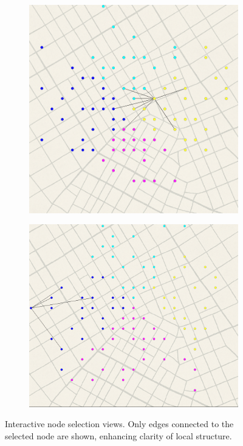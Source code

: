 \documentclass[12pt]{article}
\begin{document}
\begin{figure}[H]
    \centering
    \begin{subfigure}[b]{0.48\textwidth}
        \includegraphics[width=\textwidth]{../Images/sample_img_1_1.png}
        \label{fig:node-click-1}
    \end{subfigure}
    \hfill
    \begin{subfigure}[b]{0.48\textwidth}
        \includegraphics[width=\textwidth]{../Images/sample_img_3_1.png}
        \label{fig:node-click-2}
    \end{subfigure}
    \caption{Interactive node selection views. Only edges connected to the selected node are shown, enhancing clarity of local structure.}
    \label{fig:node-click-pair}
\end{figure}
\end{document}
